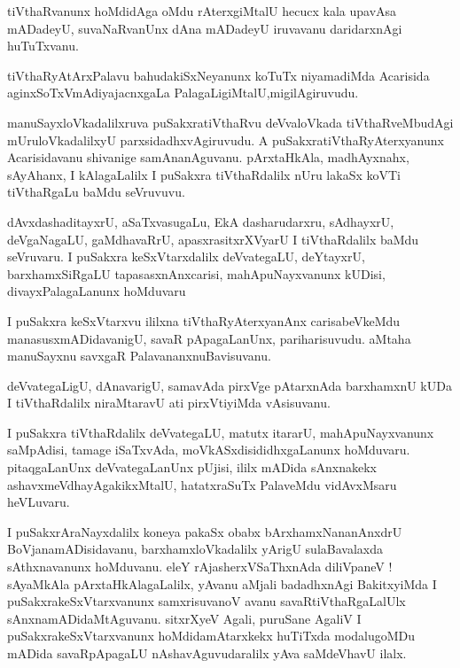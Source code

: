 \documentclass{article}
\begin{document}
\begin{mn}
tiVthaRvanunx hoMdidAga oMdu rAterxgiMtalU hecucx kala upavAsa mADadeyU, suvaNaRvanUnx dAna
mADadeyU iruvavanu daridarxnAgi huTuTxvanu.
\end{mn}

\begin{mn}
tiVthaRyAtArxPalavu bahudakiSxNeyanunx koTuTx niyamadiMda Acarisida aginxSoTxVmAdiyajacnxgaLa
PalagaLigiMtalU,migilAgiruvudu.
\end{mn}

\begin{mn}
manuSayxloVkadalilxruva puSakxratiVthaRvu deVvaloVkada tiVthaRveMbudAgi mUruloVkadalilxyU 
parxsidadhxvAgiruvudu. A puSakxratiVthaRyAterxyanunx Acarisidavanu shivanige samAnanAguvanu. 
pArxtaHkAla, madhAyxnahx, sAyAhanx, I kAlagaLalilx  I puSakxra tiVthaRdalilx nUru lakaSx 
koVTi tiVthaRgaLu baMdu seVruvuvu.
\end{mn}

\begin{mn}
dAvxdashaditayxrU, aSaTxvasugaLu, EkA dasharudarxru, sAdhayxrU, deVgaNagaLU, gaMdhavaRrU, 
apasxrasitxrXVyarU I tiVthaRdalilx baMdu seVruvaru. I puSakxra keSxVtarxdalilx deVvategaLU, 
deYtayxrU, barxhamxSiRgaLU tapasasxnAnxcarisi, mahApuNayxvanunx kUDisi, divayxPalagaLanunx hoMduvaru
\end{mn}

\begin{mn}
I puSakxra keSxVtarxvu ililxna tiVthaRyAterxyanAnx carisabeVkeMdu manasusxmADidavanigU, savaR 
pApagaLanUnx, pariharisuvudu. aMtaha manuSayxnu savxgaR PalavananxnuBavisuvanu.
\end{mn}

\begin{mn}
deVvategaLigU, dAnavarigU, samavAda pirxVge pAtarxnAda barxhamxnU kUDa I tiVthaRdalilx niraMtaravU
ati pirxVtiyiMda vAsisuvanu.
\end{mn}

\begin{mn}
I puSakxra tiVthaRdalilx  deVvategaLU, matutx itararU, mahApuNayxvanunx saMpAdisi, tamage iSaTxvAda,
moVkASxdisididhxgaLanunx hoMduvaru. pitaqgaLanUnx deVvategaLanUnx pUjisi,
ililx mADida sAnxnakekx ashavxmeVdhayAgakikxMtalU, hatatxraSuTx PalaveMdu vidAvxMsaru heVLuvaru.
\end{mn}

\begin{mn}
I puSakxrAraNayxdalilx koneya pakaSx obabx bArxhamxNananAnxdrU BoVjanamADisidavanu, 
barxhamxloVkadalilx yArigU sulaBavalaxda sAthxnavanunx hoMduvanu. eleY rAjasherxVSaThxnAda
diliVpaneV ! sAyaMkAla pArxtaHkAlagaLalilx, yAvanu aMjali badadhxnAgi BakitxyiMda I 
puSakxrakeSxVtarxvanunx samxrisuvanoV avanu savaRtiVthaRgaLalUlx sAnxnamADidaMtAguvanu. 
sitxrXyeV Agali, puruSane AgaliV I puSakxrakeSxVtarxvanunx hoMdidamAtarxkekx huTiTxda modalugoMDu
mADida savaRpApagaLU nAshavAguvudaralilx yAva saMdeVhavU ilalx.
\end{mn}
\end{document}

